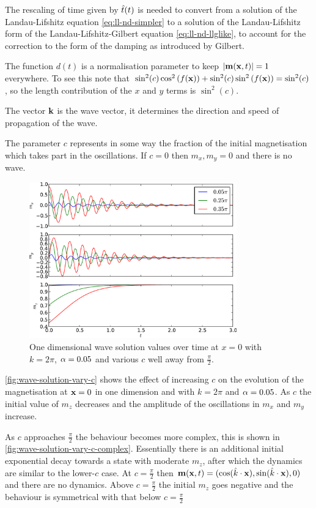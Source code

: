 The rescaling of time given by $\hat{t}(t)$ is needed to convert from a solution of the Landau-Lifshitz equation \eqref{eq:ll-nd-simpler} to a solution of the Landau-Lifshitz form of the Landau-Lifshitz-Gilbert equation \eqref{eq:ll-nd-llglike}, \ie to account for the correction to the form of the damping as introduced by Gilbert.

The function $d(t)$ is a normalisation parameter to keep $\left|{\mathbf{m}(\mathbf{x}, t)} \right| = 1$ everywhere.
To see this note that $\sin^2(c) \cos^2{\left( f(\mathbf{x}) \right)} + \sin^2(c) \sin^2{\left( f(\mathbf{x}) \right)} = \sin^2(c)$, so the length contribution of the $x$ and $y$ terms is $\sin^2(c)$.

The vector $\mathbf{k}$ is the wave vector, it determines the direction and speed of propagation of the wave.

The parameter $c$ represents in some way the fraction of the initial magnetisation which takes part in the oscillations.
If $c = 0$ then $m_x, m_y = 0$ and there is no wave. 

\begin{figure}
  \centering
  \includegraphics[width=0.8\textwidth]{plots/wave_exact_solution_parameters/exact_solution_parameters.pdf}
  \caption{One dimensional wave solution values over time at $x=0$ with $k = 2\pi$, $\alpha = 0.05$ and various $c$ well away from $\frac{\pi}{2}$.}
  \label{fig:wave-solution-vary-c}
\end{figure}

\autoref{fig:wave-solution-vary-c} shows the effect of increasing $c$ on the evolution of the magnetisation at $\mathbf{x} = 0$ in one dimension and with $k = 2\pi$ and $\alpha = 0.05$.
As $c$ the initial value of $m_z$ decreases and the amplitude of the oscillations in $m_x$ and $m_y$ increase.

As $c$ approaches $\frac{\pi}{2}$ the behaviour becomes more complex, this is shown in \autoref{fig:wave-solution-vary-c-complex}.
Essentially there is an additional initial exponential decay towards a state with moderate $m_z$, after which the dynamics are similar to the lower-$c$ case.
At $c=\frac{\pi}{2}$ then $\mathbf{m}(\mathbf{x}, t)= (\cos({\hat{k}}\cdot\mathbf{x}), \sin({\hat{k}}\cdot\mathbf{x}), 0)$ and there are no dynamics.
Above $c=\frac{\pi}{2}$ the initial $m_z$ goes negative and the behaviour is symmetrical with that below $c=\frac{\pi}{2}$

